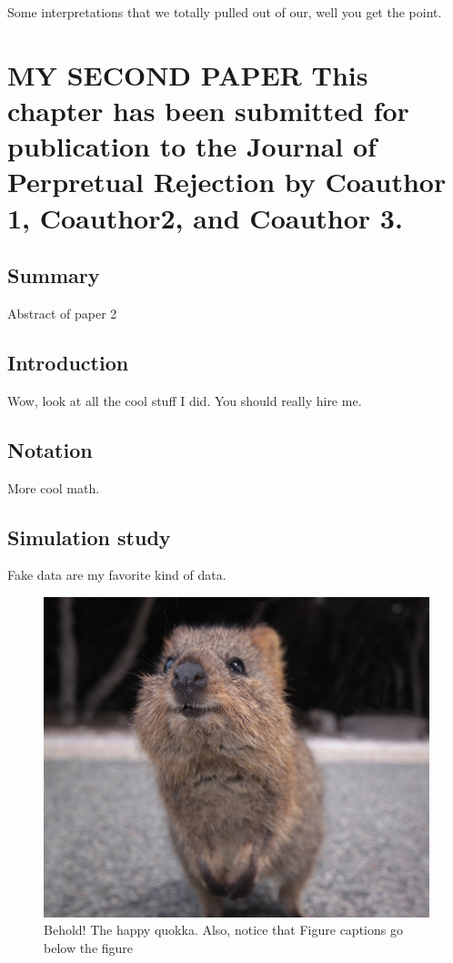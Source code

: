 \documentclass[english]{ucdenver-dissertation}
\makeatletter
\let\SF@@footnote\footnote
\def\footnote{\ifx\protect\@typeset@protect
    \expandafter\SF@@footnote
  \else
    \expandafter\SF@gobble@opt
  \fi
}
\edef\SF@gobble@opt{\noexpand\protect
  \expandafter\noexpand\csname SF@gobble@opt \endcsname}
\makeatother
\begin{document}
Some interpretations that we totally pulled out of our, well you get the point.

\newpage

\chapter{MY SECOND PAPER%
\footnote{This chapter has been submitted for publication to the Journal of Perpretual Rejection
by Coauthor 1, Coauthor2, and Coauthor 3.%
}\label{chap:paper2}}


\section{Summary}

Abstract of paper 2


\section{Introduction}

Wow, look at all the cool stuff I did.  You should really hire me.


\section{Notation}

More cool math.



\section{Simulation study}

Fake data are my favorite kind of data.

\begin{figure}
\begin{centering}
\includegraphics[width=5in]{quokka.jpg}
\par\end{centering}

\caption{Behold! The happy quokka.  Also, notice that Figure captions go below the figure}
\end{figure}
\end{document}
